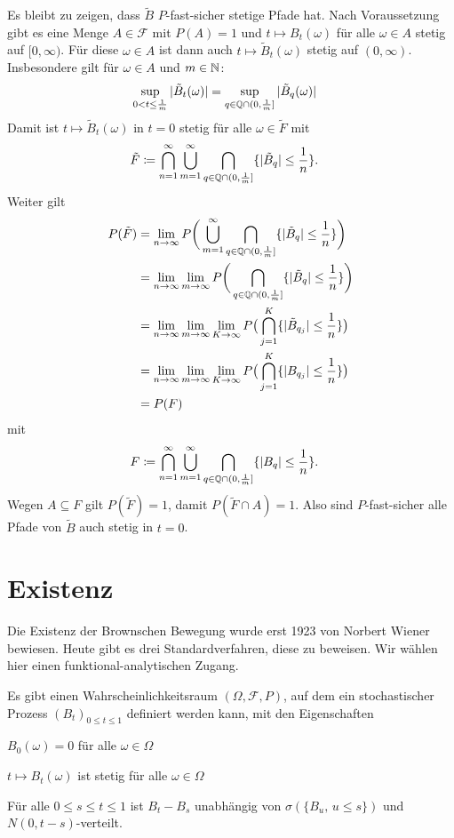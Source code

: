 \documentclass[a4paper,twoside,DIV15,BCOR12mm]{scrbook}
\newcommand{\cF}{\mathcal F}
\begin{document}
\begin{beweis}
Es bleibt zu zeigen, dass $\tilde B$ $P$-fast-sicher stetige Pfade hat. Nach Voraussetzung gibt es eine Menge $A\in \cF$ mit $P(A)=1$ und $t\mapsto B_t(\omega)$ für alle $\omega \in A$ stetig auf $[0,\infty)$. Für diese $\omega\in A$ ist dann auch $t\mapsto \tilde B_t(\omega)$ stetig auf $(0,\infty)$. Insbesondere gilt für $\omega\in A$ und $m\in \mathbb{N}$:
\begin{align*}
\sup_{0<t\le \frac 1m} |\tilde B_t(\omega)| &=
\sup_{q\in \mathbb{Q} \cap (0,\frac1m]} |\tilde B_q(\omega)|
\end{align*}
Damit ist $t\mapsto \tilde B_t(\omega)$ in $t=0$ stetig für alle $\omega \in \tilde F$ mit 
\begin{align*}
\tilde F &\da \bigcap_{n=1}^\infty \bigcup_{m=1}^\infty \bigcap_{q\in \MdQ\cap(0,\frac 1m]} \{|\tilde B_q|\le \frac 1n\}.
\end{align*}
Weiter gilt 
\begin{align*}
P(\tilde F) &= \lim_{n\to\infty} P\bigg(\bigcup_{m=1}^\infty \bigcap_{q\in \mathbb{Q}\cap(0,\frac 1m]} \{|\tilde B_q|\le \frac 1n\}\bigg) \\
&= \lim_{n\to \infty} \lim_{m\to \infty} P\bigg(\bigcap_{q\in \mathbb{Q}\cap(0,\frac 1m]} \{|\tilde B_q|\le \frac 1n\}\bigg) \\
&= \lim_{n\to \infty} \lim_{m\to \infty} \lim_{K\to \infty}  P\big(\bigcap_{j=1}^K \{|\tilde B_{q_j}|\le \frac 1n\}\big) \\
&= \lim_{n\to \infty} \lim_{m\to \infty} \lim_{K\to \infty}  P\big(\bigcap_{j=1}^K \{|B_{q_j}|\le \frac 1n\}\big) \\
&= P(F)
\end{align*}
mit 
\begin{align*}
F &\da \bigcap_{n=1}^\infty \bigcup_{m=1}^\infty \bigcap_{q\in \MdQ\cap(0,\frac 1m]} \{|B_q|\le \frac 1n\}.
\end{align*}
Wegen $A\subseteq F$ gilt $P(\tilde F)=1$, damit $P(\tilde F\cap A)=1$. Also sind $P$-fast-sicher alle Pfade von $\tilde B$ auch stetig in $t=0$.
\end{beweis}

\section{Existenz}

Die Existenz der Brownschen Bewegung wurde erst 1923 von Norbert Wiener bewiesen. Heute gibt es drei Standardverfahren, diese zu beweisen. Wir wählen hier einen funktional-analytischen Zugang.

\begin{satz}
Es gibt einen Wahrscheinlichkeitsraum $(\Omega, \cF, P)$, auf dem ein stochastischer Prozess $(B_t)_{0\le t \le 1}$ definiert werden kann, mit den Eigenschaften
\begin{enuma}
\item $B_0(\omega) = 0$ für alle $\omega\in \Omega$
\item $t\mapsto B_t(\omega)$ ist stetig für alle $\omega\in\Omega$
\item Für alle $0\le s\le t\le 1$ ist $B_t-B_s$ unabhängig von $\sigma(\{B_u,\,u\le s\})$ und $N(0,t-s)$-verteilt.
\end{enuma}
\end{satz}
\end{document}

